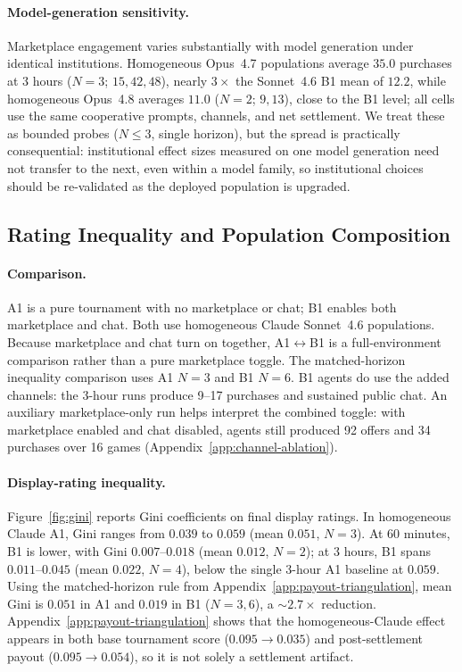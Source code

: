 \documentclass{article}
\begin{document}
\paragraph{Model-generation sensitivity.}
Marketplace engagement varies substantially with model generation under identical institutions.
Homogeneous Opus~4.7 populations average $35.0$ purchases at 3 hours ($N{=}3$; $15, 42, 48$), nearly $3\times$ the Sonnet~4.6 B1 mean of $12.2$, while homogeneous Opus~4.8 averages $11.0$ ($N{=}2$; $9, 13$), close to the B1 level; all cells use the same cooperative prompts, channels, and net settlement.
We treat these as bounded probes ($N \leq 3$, single horizon), but the spread is practically consequential: institutional effect sizes measured on one model generation need not transfer to the next, even within a model family, so institutional choices should be re-validated as the deployed population is upgraded.

\subsection{Rating Inequality and Population Composition}
\label{sec:inequality}

\paragraph{Comparison.}
A1 is a pure tournament with no marketplace or chat; B1 enables both marketplace and chat.
Both use homogeneous Claude Sonnet~4.6 populations.
Because marketplace and chat turn on together, A1$\leftrightarrow$B1 is a full-environment comparison rather than a pure marketplace toggle.
The matched-horizon inequality comparison uses A1 $N{=}3$ and B1 $N{=}6$.
B1 agents do use the added channels: the 3-hour runs produce 9--17 purchases and sustained public chat.
An auxiliary marketplace-only run helps interpret the combined toggle: with marketplace enabled and chat disabled, agents still produced 92 offers and 34 purchases over 16 games (Appendix~\ref{app:channel-ablation}).

\paragraph{Display-rating inequality.}
Figure~\ref{fig:gini} reports Gini coefficients on final display ratings.
In homogeneous Claude A1, Gini ranges from $0.039$ to $0.059$ (mean $0.051$, $N{=}3$).
At 60 minutes, B1 is lower, with Gini $0.007$--$0.018$ (mean $0.012$, $N{=}2$); at 3 hours, B1 spans $0.011$--$0.045$ (mean $0.022$, $N{=}4$), below the single 3-hour A1 baseline at $0.059$.
Using the matched-horizon rule from Appendix~\ref{app:payout-triangulation}, mean Gini is $0.051$ in A1 and $0.019$ in B1 ($N{=}3,6$), a $\sim 2.7\times$ reduction.
Appendix~\ref{app:payout-triangulation} shows that the homogeneous-Claude effect appears in both base tournament score ($0.095\to0.035$) and post-settlement payout ($0.095\to0.054$), so it is not solely a settlement artifact.
\end{document}
